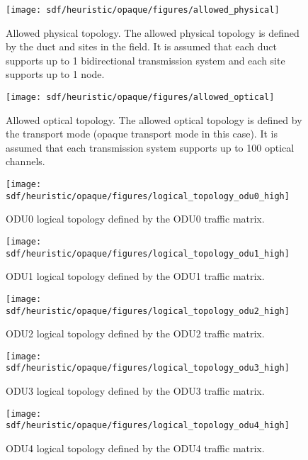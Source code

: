 \begin{figure}[H]
\centering
\texttt{[image: sdf/heuristic/opaque/figures/allowed\_physical]}
\caption{Allowed physical topology. The allowed physical topology is defined by the duct and sites in the field. It is assumed that each duct supports up to 1 bidirectional transmission system and each site supports up to 1 node.}
\label{allowed_physical_surv_ref_high_heuristic}
\end{figure}

\begin{figure}[H]
\centering
\texttt{[image: sdf/heuristic/opaque/figures/allowed\_optical]}
\caption{Allowed optical topology. The allowed optical topology is defined by the transport mode (opaque transport mode in this case). It is assumed that each transmission system supports up to 100 optical channels.}
\label{allowed_optical_surv_ref_high_heuristic}
\end{figure}

\begin{figure}[H]
\centering
\texttt{[image: sdf/heuristic/opaque/figures/logical\_topology\_odu0\_high]}
\caption{ODU0 logical topology defined by the ODU0 traffic matrix.}
\label{logical_ODU0_surv_ref_high_heuristic}
\end{figure}

\begin{figure}[H]
\centering
\texttt{[image: sdf/heuristic/opaque/figures/logical\_topology\_odu1\_high]}
\caption{ODU1 logical topology defined by the ODU1 traffic matrix.}
\label{logical_ODU1_surv_ref_high_heuristic}
\end{figure}

\begin{figure}[H]
\centering
\texttt{[image: sdf/heuristic/opaque/figures/logical\_topology\_odu2\_high]}
\caption{ODU2 logical topology defined by the ODU2 traffic matrix.}
\label{logical_ODU2_surv_ref_high_heuristic}
\end{figure}

\begin{figure}[H]
\centering
\texttt{[image: sdf/heuristic/opaque/figures/logical\_topology\_odu3\_high]}
\caption{ODU3 logical topology defined by the ODU3 traffic matrix.}
\label{logical_ODU3_surv_ref_high_heuristic}
\end{figure}

\begin{figure}[H]
\centering
\texttt{[image: sdf/heuristic/opaque/figures/logical\_topology\_odu4\_high]}
\caption{ODU4 logical topology defined by the ODU4 traffic matrix.}
\label{logical_ODU4_surv_ref_high_heuristic}
\end{figure}

